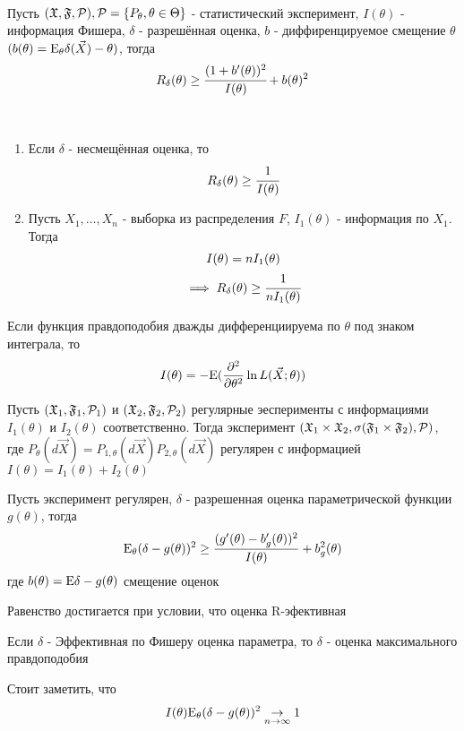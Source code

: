 \documentclass[main.tex]{subfiles}
\begin{document}
\begin{theorem} ~\\
	Пусть $(\mathfrak{X},\mathfrak{F},\mathcal{P}), \mathcal{P} = \{P_\theta, \theta \in \Theta\}$ - статистический эксперимент, $I(\theta)$ - информация Фишера, $\delta$ - разрешённая оценка, $b$ - диффиренцируемое смещение $\theta$	$(b(\theta) = \mathrm{E}_\theta\delta(\vec X)-\theta)$, тогда
	\[R_\delta(\theta)\geq\cfrac{(1+b'(\theta))^2}{I(\theta)}+b(\theta)^2\]
\end{theorem}
\begin{suggestion} ~\\
	\begin{enumerate}
		\item Если $\delta$ - несмещённая оценка, то
		\[R_\delta(\theta)\geq\cfrac{1}{I(\theta)}\]
		\item Пусть $X_1,\dots,X_n$ - выборка из распределения $F$, $I_1(\theta)$ - информация по $X_1$. Тогда
		\begin{gather*}
			I(\theta) = nI_1(\theta)\\
			\implies R_\delta(\theta)\geq\cfrac{1}{nI_1(\theta)}
		\end{gather*}
	\end{enumerate}
\end{suggestion}

Если функция правдоподобия дважды дифференциируема по $\theta$ под знаком интеграла, то $$I(\theta)=-\mathrm{E}(\frac{\partial^2}{\partial\theta^2}\ln L(\vec{X};\theta))$$

\begin{suggestion}
	Пусть $(\mathfrak{X}_1,\mathfrak{F}_1,\mathcal{P}_1)$ и $(\mathfrak{X}_2,\mathfrak{F}_2,\mathcal{P}_2)$ регулярные эесперименты с информациями $I_1(\theta)$ и $I_2(\theta)$ соответственно. Тогда эксперимент $(\mathfrak{X}_1\times\mathfrak{X}_2,\sigma(\mathfrak{F}_1\times\mathfrak{F}_2),\mathcal{P})$, где $P_\theta(d\vec{X})=P_{1,\theta}(d\vec{X})P_{2,\theta}(d\vec{X})$ регулярен с информацией $I(\theta)=I_1(\theta)+I_2(\theta)$
\end{suggestion}

\begin{theorem}
	Пусть эксперимент регулярен, $\delta$ - разрешенная оценка параметрической функции $g(\theta)$, тогда
	$$\mathrm{E}_\theta(\delta-g(\theta))^2\geq \frac{(g'(\theta)-b'_g(\theta))^2}{I(\theta)} + b_g^2(\theta)$$
	где $b(\theta)=\mathrm{E}\delta - g(\theta)$ смещение оценок
\end{theorem}

Равенство достигается при условии, что оценка R-эфективная

\begin{suggestion}
	Если $\delta$ - Эффективная по Фишеру оценка параметра, то $\delta$ - оценка максимального правдоподобия
\end{suggestion}

Стоит заметить, что $$I(\theta)\mathrm{E}_\theta(\delta-g(\theta))^2 \underset{n\rightarrow\infty}{\rightarrow}1$$
\end{document}
